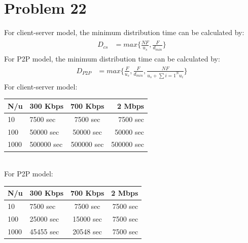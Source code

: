 \documentclass[titlepage, paper=a4, fontsize=11pt]{scrartcl} %
\numberwithin{equation}{section} %
\numberwithin{table}{section} %
\begin{document}

\section*{Problem 22}
For client-server model, the minimum distribution time can be calculated by:
\begin{align*} 
\begin{split}
D_{cs} &= max\{ \frac{NF}{u_s}, \frac{F}{d_{min}} \}
\end{split}					
\end{align*}
For P2P model, the minimum distribution time can be calculated by:
\begin{align*} 
\begin{split}
D_{P2P} &= max\{ \frac{F}{u_s}, \frac{F}{d_{min}}, \frac{NF}{u_s + \sum \limits{i=1}^N u_i} \}
\end{split}					
\end{align*}
For client-server model:
\begin{table}[h!]
  \begin{center}
    \label{tab:table1}
    \begin{tabular}{ l | l | c | r }
      N/u & 300 Kbps & 700 Kbps & 2 Mbps \\
      \hline
      10 & 7500 sec & 7500 sec & 7500 sec \\
      \hline
      100 & 50000 sec & 50000 sec & 50000 sec \\
      \hline
      1000 & 500000 sec & 500000 sec & 500000 sec \\
    \end{tabular}
  \end{center}
\end{table}
\\
For P2P model:
\begin{table}[h!]
  \begin{center}
    \label{tab:table1}
    \begin{tabular}{ l | l | c | r }
      N/u & 300 Kbps & 700 Kbps & 2 Mbps \\
      \hline
      10 & 7500 sec & 7500 sec & 7500 sec \\
      \hline
      100 & 25000 sec & 15000 sec & 7500 sec \\
      \hline
      1000 & 45455 sec & 20548 sec & 7500 sec \\
    \end{tabular}
  \end{center}
\end{table}
\\
\end{document}
